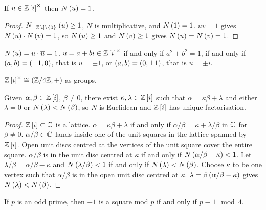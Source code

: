 \begin{proposition}
If $ u \in \mathbb{Z}\left[ i \right]^\times $ then $ N\left( u \right) = 1 $.
\end{proposition}

\begin{proof}
$ N \mid_{\mathbb{Z}\left[ i \right] \setminus \left\{ 0 \right\}}\left( u \right) \ge 1 $, $ N $ is multiplicative, and $ N\left( 1 \right) = 1 $. $ uv = 1 $ gives $ N\left( u \right) \cdot N\left( v \right) = 1 $, so $ N\left( u \right) \ge 1 $ and $ N\left( v \right) \ge 1 $ gives $ N\left( u \right) = N\left( v \right) = 1 $.
\end{proof}

$ N\left( u \right) = u \cdot \overline{u} = 1 $. $ u = a + bi \in \mathbb{Z}\left[ i \right]^\times $ if and only if $ a^2 + b^2 = 1 $, if and only if $ \left( a, b \right) = \left( \pm 1, 0 \right) $, that is $ u = \pm 1 $, or $ \left( a, b \right) = \left( 0, \pm 1 \right) $, that is $ u = \pm i $.

\begin{remark*}
$ \mathbb{Z}\left[ i \right]^\times \cong \left( \mathbb{Z} / 4\mathbb{Z}, + \right) $ as groups.
\end{remark*}

\begin{proposition}
Given $ \alpha, \beta \in \mathbb{Z}\left[ i \right] $, $ \beta \ne 0 $, there exist $ \kappa, \lambda \in \mathbb{Z}\left[ i \right] $ such that $ \alpha = \kappa\beta + \lambda $ and either $ \lambda = 0 $ or $ N\left( \lambda \right) < N\left( \beta \right) $, so $ N $ is Euclidean and $ \mathbb{Z}\left[ i \right] $ has unique factorisation.
\end{proposition}

\begin{proof}
$ \mathbb{Z}\left[ i \right] \subset \mathbb{C} $ is a lattice. $ \alpha = \kappa\beta + \lambda $ if and only if $ \alpha / \beta = \kappa + \lambda / \beta $ in $ \mathbb{C} $ for $ \beta \ne 0 $. $ \alpha / \beta \in \mathbb{C} $ lands inside one of the unit squares in the lattice spanned by $ \mathbb{Z}\left[ i \right] $. Open unit discs centred at the vertices of the unit square cover the entire square. $ \alpha / \beta $ is in the unit disc centred at $ \kappa $ if and only if $ N\left( \alpha / \beta - \kappa \right) < 1 $. Let $ \lambda / \beta = \alpha / \beta - \kappa $ and $ N\left( \lambda / \beta \right) < 1 $ if and only if $ N\left( \lambda \right) < N\left( \beta \right) $. Choose $ \kappa $ to be one vertex such that $ \alpha / \beta $ is in the open unit disc centred at $ \kappa $. $ \lambda = \beta\left( \alpha / \beta - \kappa \right) $ gives $ N\left( \lambda \right) < N\left( \beta \right) $.
\end{proof}

\begin{lemma}
If $ p $ is an odd prime, then $ -1 $ is a square mod $ p $ if and only if $ p \equiv 1 \mod 4 $.
\end{lemma}

